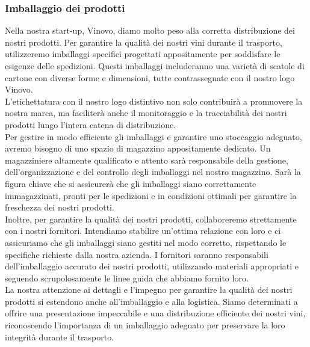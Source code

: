 \documentclass[12pt, a4paper]{article}
\newcommand{\meskip}{\medskip \\}
\begin{document}
\subsubsection{Imballaggio dei prodotti}
Nella nostra start-up, Vinovo, diamo molto peso alla corretta distribuzione dei nostri prodotti. Per garantire la qualità dei nostri vini durante il trasporto, utilizzeremo imballaggi specifici progettati appositamente per soddisfare le esigenze delle spedizioni. Questi imballaggi includeranno una varietà di scatole di cartone con diverse forme e dimensioni, tutte contrassegnate con il nostro logo Vinovo.\meskip
L'etichettatura con il nostro logo distintivo non solo contribuirà a promuovere la nostra marca, ma faciliterà anche il monitoraggio e la tracciabilità dei nostri prodotti lungo l'intera catena di distribuzione. \meskip
Per gestire in modo efficiente gli imballaggi e garantire uno stoccaggio adeguato, avremo bisogno di uno spazio di magazzino appositamente dedicato. Un magazziniere altamente qualificato e attento sarà responsabile della gestione, dell'organizzazione e del controllo degli imballaggi nel nostro magazzino. Sarà la figura chiave che si assicurerà che gli imballaggi siano correttamente immagazzinati, pronti per le spedizioni e in condizioni ottimali per garantire la freschezza dei nostri prodotti.\meskip
Inoltre, per garantire la qualità dei nostri prodotti, collaboreremo strettamente con i nostri fornitori. Intendiamo stabilire un'ottima relazione con loro e ci assicuriamo che gli imballaggi siano gestiti nel modo corretto, rispettando le specifiche richieste dalla nostra azienda. I fornitori saranno responsabili dell'imballaggio accurato dei nostri prodotti, utilizzando materiali appropriati e seguendo scrupolosamente le linee guida che abbiamo fornito loro.\meskip
La nostra attenzione ai dettagli e l'impegno per garantire la qualità dei nostri prodotti si estendono anche all'imballaggio e alla logistica. Siamo determinati a offrire una presentazione impeccabile e una distribuzione efficiente dei nostri vini, riconoscendo l'importanza di un imballaggio adeguato per preservare la loro integrità durante il trasporto.
\end{document}
